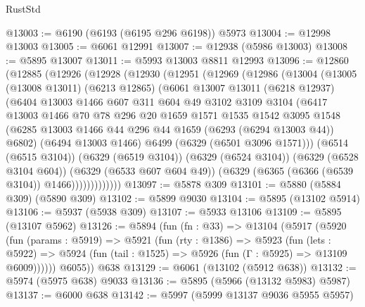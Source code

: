 \begin{lexlean}{RustStd}
\begin{coremodule}
{\begin{coremodule}
{{{{{{{{{{{{{{{{{{{{{{{{{{{{{{{{{{{@13003 := @6190 (@6193 (@6195 @296 @6198)) @5973
@13004 := @12998 @13003
@13005 := @6061 @12991
@13007 := @12938 (@5986 @13003)
@13008 := @5895 @13007
@13011 := @5993 @13003 @8811 @12993
@13096 := @12860
    (@12885
      (@12926
        (@12928
          (@12930
            (@12951
              (@12969
                (@12986
                  (@13004
                    (@13005
                      (@13008 @13011)
                      (@6213 @12865)
                      (@6061
                        @13007
                        @13011
                        (@6218 @12937)
                        (@6404
                          @13003
                          @1466
                          @607
                          @311
                          @604
                          @49
                          @3102
                          @3109
                          @3104
                          (@6417
                            @13003
                            @1466
                            @70
                            @78
                            @296
                            @20
                            @1659
                            @1571
                            @1535
                            @1542
                            @3095
                            @1548
                            (@6285 @13003 @1466 @44 @296 @44 @1659 (@6293 (@6294 @13003 @44)) @6802)
                            (@6494 @13003 @1466)
                            @6499
                            (@6329 (@6501 @3096 @1571)))
                          (@6514 (@6515 @3104))
                          (@6329 (@6519 @3104))
                          (@6329 (@6524 @3104))
                          (@6329 (@6528 @3104 @604))
                          (@6329 (@6533 @607 @604 @49))
                          (@6329 (@6365 (@6366 (@6539 @3104)) @1466)))))))))))))
@13097 := @5878 @309
@13101 := @5880 (@5884 @309) (@5890 @309)
@13102 := @5899 @9030
@13104 := @5895 (@13102 @5914)
@13106 := @5937 (@5938 @309)
@13107 := @5933 @13106
@13109 := @5895 (@13107 @5962)
@13126 := @5894
    (fun (fn : @33) =>
    @13104
      (@5917
        (@5920
          (fun (params : @5919) =>
          @5921
            (fun (rty : @1386) =>
            @5923
              (fun (lets : @5922) =>
              @5924 (fun (tail : @1525) => @5926 (fun (Γ : @5925) => @13109 @6009))))))
        @6055))
    @638
@13129 := @6061 (@13102 (@5912 @638))
@13132 := @5974 (@5975 @638) @9033
@13136 := @5895 (@5966 (@13132 @5983) @5987)
@13137 := @6000 @638
@13142 := @5997 (@5999 @13137 @9036 @5955 @5957)
}}}}}}}}}}}}}}}}}}}}}}}}}}}}}}}}}}}
\end{coremodule}}
\end{coremodule}
\end{lexlean}
